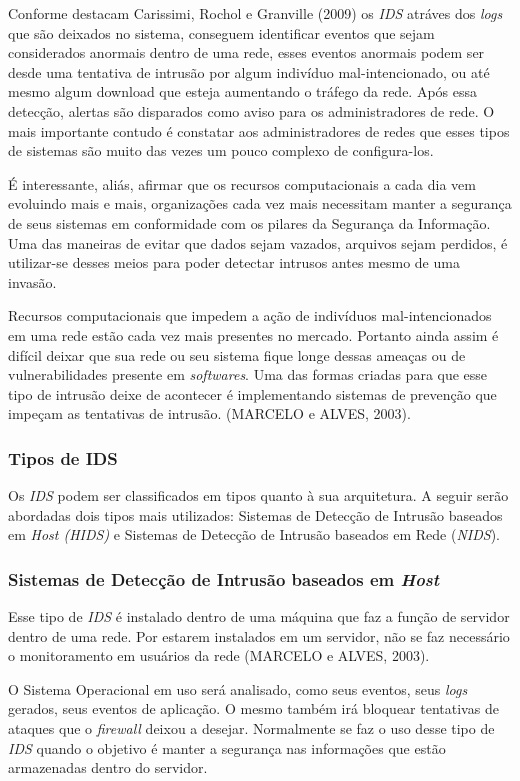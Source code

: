 Conforme destacam Carissimi, Rochol e Granville (2009) os \textit{IDS} atráves dos \textit{logs} que são deixados no sistema, conseguem identificar eventos que sejam considerados anormais dentro de uma rede, esses eventos anormais podem ser desde uma tentativa de intrusão por algum indivíduo mal-intencionado, ou até mesmo algum download que esteja aumentando o tráfego da rede. Após essa detecção, alertas são disparados como aviso para os administradores de rede. O mais importante contudo é constatar aos administradores de redes que esses tipos de sistemas são muito das vezes um pouco complexo de configura-los.

É interessante, aliás, afirmar que os recursos computacionais a cada dia vem evoluindo mais e mais, organizações cada vez mais necessitam manter a segurança de seus sistemas em conformidade com os pilares da Segurança da Informação. Uma das maneiras de evitar que dados sejam vazados, arquivos sejam perdidos, é utilizar-se desses meios para poder detectar intrusos antes mesmo de uma invasão. 

Recursos computacionais que impedem a ação de indivíduos mal-intencionados em uma rede estão cada vez mais presentes no mercado. Portanto ainda assim é difícil deixar que sua rede ou seu sistema fique longe dessas ameaças ou de vulnerabilidades presente em \textit{softwares}. Uma das formas criadas para que esse tipo de intrusão deixe de acontecer é implementando sistemas de prevenção que impeçam as tentativas de intrusão. (MARCELO e ALVES, 2003).

\subsubsection{Tipos de IDS}
Os \textit{IDS} podem ser classificados em tipos quanto à sua arquitetura. A seguir serão abordadas dois tipos mais utilizados: Sistemas de Detecção de Intrusão baseados em \textit{Host (HIDS)} e Sistemas de Detecção de Intrusão baseados em Rede (\textit{NIDS}).

\subsubsection{Sistemas de Detecção de Intrusão baseados em \textit{Host}}
Esse tipo de \textit{IDS} é instalado dentro de uma máquina que faz a função de servidor dentro de uma rede. Por estarem instalados em um servidor, não se faz necessário o monitoramento em usuários da rede (MARCELO e ALVES, 2003).

O Sistema Operacional em uso será analisado, como seus eventos, seus \textit{logs} gerados, seus eventos de aplicação. O mesmo também irá bloquear tentativas de ataques que o \textit{firewall} deixou a desejar. Normalmente se faz o uso desse tipo de \textit{IDS} quando o objetivo é manter a segurança nas informações que estão armazenadas dentro do servidor.

